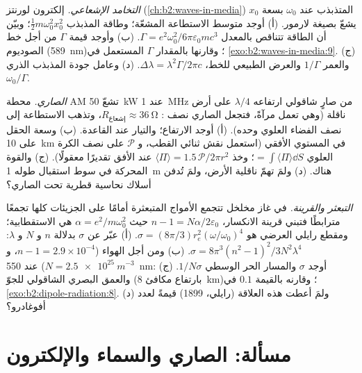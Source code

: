 \begin{exercise}[$\star\star\star$]\label{exo:b2:dipole-radiation:10}
\emph{التخامد الإشعاعي.} إلكترون لورنتز (\cref{ch:b2:waves-in-media})
المتذبذب عند $\omega_0$ بسعة $x_0$ يشعّ بصيغة لارمور.
(أ) أوجد متوسط الاستطاعة المشعّة؛ وطاقة المذبذب $\tfrac12m\omega_0^2x_0^2$؛
وبيّن أن الطاقة تتناقص بالمعدل $\Gamma = e^2\omega_0^2/6\pi\varepsilon_0mc^3$.
(ب) وأوجد قيمة $\Gamma$ من أجل خط الصوديوم (\qty{589}{nm})؛ وقارنها بالمقدار
$\Gamma$ المستعمل في \cref{exo:b2:waves-in-media:9}. (ج) والعمر $1/\Gamma$ والعرض
الطبيعي للخط، $\Delta\lambda = \lambda^2\Gamma/2\pi c$. (د) وعامل جودة
المذبذب الذري $\omega_0/\Gamma$.
\end{exercise}

\begin{exercise}[$\star\star\star$]\label{exo:b2:dipole-radiation:11}
\emph{الصاري.} محطة AM تشعّ \qty{50}{kW} عند \qty{1}{MHz} من
صارٍ شاقولي ارتفاعه $\lambda/4$ على أرض ناقلة (وهي تعمل
مرآةً، فتجعل الصاري نصف : $R_{\text{إشعاع}} \approx
\qty{36}{\ohm}$، وتذهب الاستطاعة إلى نصف الفضاء العلوي وحده). (أ)
أوجد الارتفاع؛ والتيار عند القاعدة. (ب) وسعة الحقل على \qty{10}{km} في
المستوي الأفقي (استعمل نقش ثنائي القطب، و $\mathcal P$ على نصف الكرة
العلوي $= \int\langle\Pi\rangle\dd S$؛ وخذ $\langle\Pi\rangle = 1.5\,
\mathcal P/2\pi r^2$ عند الأفق تقديرًا معقولًا). (ج) والقوة المحركة في
سوط استقبال طوله \qty{1}{m} هناك. (د) ولمَ تهمّ ناقلية الأرض،
ولمَ تُدفن أسلاك نحاسية قطرية تحت الصاري؟
\end{exercise}

\begin{exercise}[$\star\star\star$]\label{exo:b2:dipole-radiation:12}
\emph{التبعثر والقرينة.} في غاز مخلخل تتجمع الأمواج المتبعثرة
أمامًا على الجزيئات كلها تجمعًا مترابطًا فتبني قرينة الانكسار،
$n - 1 = N\alpha/2\varepsilon_0$ حيث $\alpha = e^2/m\omega_0^2$ هي الاستقطابية؛ ومقطع
رايلي العرضي هو $\sigma = (8\pi/3)r_e^2(\omega/\omega_0)^4$. (أ) عبّر عن
$\sigma$ بدلالة $n$ و $N$ و $\lambda$: $\sigma = 8\pi^3(n^2 - 1)^2/3N^2\lambda^4$. (ب)
ومن أجل الهواء ($n - 1 = 2.9 \times 10^{-4}$، و $N = \qty{2.5e25}{m^{-3}}$) عند \qty{550}{nm}:
أوجد $\sigma$ والمسار الحر الوسطي $1/N\sigma$. (ج) والعمق البصري الشاقولي
للجوّ (بارتفاع مكافئ \qty{8}{km})؛ وقارنه بالقيمة $0.1$ في
\cref{exo:b2:dipole-radiation:8}. (د) ولمَ أعطت هذه العلاقة (رايلي،
1899) قيمةً لعدد أفوغادرو؟
\end{exercise}

\section{مسألة: الصاري والسماء والإلكترون}

